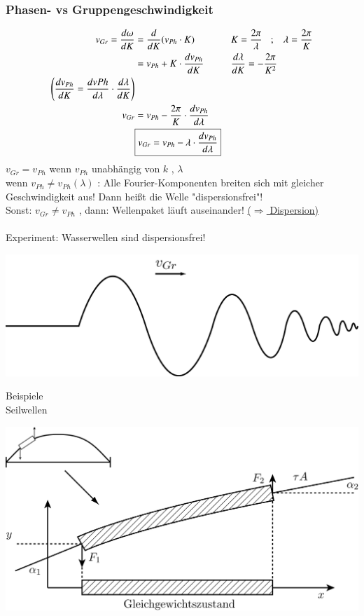  \subsubsection{Phasen- vs Gruppengeschwindigkeit}
 \begin{align*}
 	v_{Gr} = \frac{d\omega}{dK} &= \frac{d}{dK} (v_{Ph} \cdot K) &&K=\frac{2\pi}{\lambda} \hspace{3mm};\hspace{3mm}\lambda=\frac{2\pi}{K}\\
 	&=v_{Ph} + K \cdot \frac{dv_{Ph}}{dK} &&\frac{d\lambda}{dK} = - \frac{2\pi}{K^2}\\
 	\left( \frac{dv_{Ph}}{dK} = \frac{dv{Ph}}{d\lambda} \cdot \frac{d\lambda}{dK}  \right) \\
 	v_{Gr} &= v_{Ph} -  \frac{2\pi}{K} \cdot \frac{ dv_{Ph} }{d\lambda} \\
 	&\boxed{v_{Gr} = v_{Ph} - \lambda \cdot \frac{ dv_{Ph} }{d\lambda} }
 \end{align*}
 $ v_{Gr}  = v _{Ph} $ wenn $ v_{Ph} $ unabhängig von $ k $ , $ \lambda $\\
 wenn $ v_{Ph} \neq v_{Ph}(\lambda) $ : Alle Fourier-Komponenten breiten sich mit gleicher Geschwindigkeit aus! Dann heißt die Welle "dispersionsfrei"!\\
 Sonst: $ v_{Gr} \neq v_{Ph} $ , dann: Wellenpaket läuft auseinander! \underline{($ \Rightarrow $ Dispersion)}\\
 \hfill \\
 Experiment: Wasserwellen sind dispersionsfrei!
 \begin{center}
 	\includegraphics[width=0.5\linewidth]{skizzen/19/19B19}
 \end{center}
 Beispiele\\
 Seilwellen
 \begin{center}
 	\includegraphics[width=0.7\linewidth]{skizzen/19/19B20}
 \end{center}
